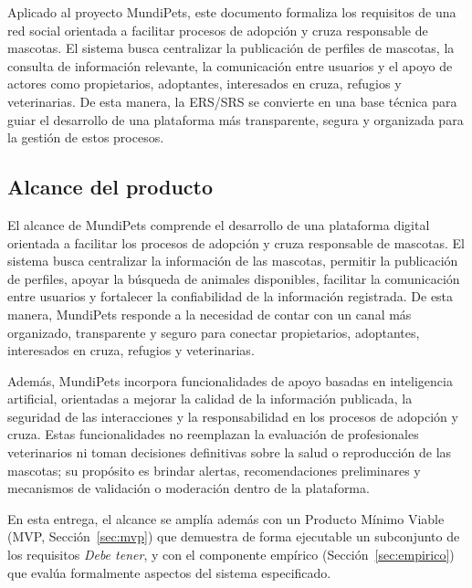 \documentclass[journal,onecolumn]{IEEEtran}
\begin{document}
	Aplicado al proyecto MundiPets, este documento formaliza los requisitos de una
	red social orientada a facilitar procesos de adopción y cruza responsable de
	mascotas. El sistema busca centralizar la publicación de perfiles de mascotas,
	la consulta de información relevante, la comunicación entre usuarios y el
	apoyo de actores como propietarios, adoptantes, interesados en cruza, refugios
	y veterinarias. De esta manera, la ERS/SRS se convierte en una base técnica
	para guiar el desarrollo de una plataforma más transparente, segura y
	organizada para la gestión de estos procesos.
	
	\subsection{Alcance del producto}
	\label{sec:alcance}
	
	El alcance de MundiPets comprende el desarrollo de una plataforma digital
	orientada a facilitar los procesos de adopción y cruza responsable de
	mascotas. El sistema busca centralizar la información de las mascotas,
	permitir la publicación de perfiles, apoyar la búsqueda de animales
	disponibles, facilitar la comunicación entre usuarios y fortalecer la
	confiabilidad de la información registrada. De esta manera, MundiPets responde
	a la necesidad de contar con un canal más organizado, transparente y seguro
	para conectar propietarios, adoptantes, interesados en cruza, refugios y
	veterinarias.
	
	Además, MundiPets incorpora funcionalidades de apoyo basadas en inteligencia
	artificial, orientadas a mejorar la calidad de la información publicada, la
	seguridad de las interacciones y la responsabilidad en los procesos de
	adopción y cruza. Estas funcionalidades no reemplazan la evaluación de
	profesionales veterinarios ni toman decisiones definitivas sobre la salud o
	reproducción de las mascotas; su propósito es brindar alertas, recomendaciones
	preliminares y mecanismos de validación o moderación dentro de la plataforma.
	
	En esta entrega, el alcance se amplía además con un Producto Mínimo Viable
	(MVP, Sección~\ref{sec:mvp}) que demuestra de forma ejecutable un subconjunto
	de los requisitos \emph{Debe tener}, y con el componente empírico
	(Sección~\ref{sec:empirico}) que evalúa formalmente aspectos del sistema
	especificado.
	
\end{document}
